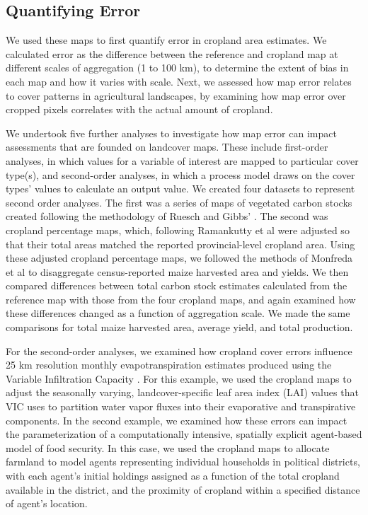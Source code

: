 \documentclass{pnastwo}
\begin{document}
\begin{article}
\vspace{-0.5 cm}
\section{Quantifying Error}
We used these maps to first quantify error in cropland area estimates. We calculated error as the difference between the reference and cropland map at different scales of aggregation (1 to 100 km), to determine the extent of bias in each map and how it varies with scale. Next, we assessed how map error relates to cover patterns in agricultural  landscapes, by examining how map error over cropped pixels correlates with the actual amount of cropland.    

We undertook five further analyses to investigate how map error can impact assessments that are founded on landcover maps. These include first-order analyses, in which values for a variable of interest are mapped to  particular cover type(s), and second-order analyses, in which a process model draws on the cover types' values to calculate an output value. We created four datasets to represent second order analyses. The first was a series of maps of vegetated carbon stocks created following the methodology of Ruesch and Gibbs' \cite{ruesch_new_2008}. The second was cropland percentage maps, which, following Ramankutty et al \cite{ramankutty_farming_2008} were adjusted so that their total areas matched the reported provincial-level cropland area. Using these adjusted cropland percentage maps, we followed the methods of Monfreda et al \cite{monfreda_farming_2008} to disaggregate census-reported maize harvested area and yields. We then compared differences between total carbon stock estimates calculated from the reference map with those from the four cropland maps, and again examined how these differences changed as a function of aggregation scale.  We made the same comparisons for total maize harvested area, average yield, and total production. 

For the second-order analyses, we examined how cropland cover errors influence 25 km resolution monthly evapotranspiration estimates produced using the Variable Infiltration Capacity \cite{liang_simple_1994}. For this example, we used the cropland maps to adjust the seasonally varying, landcover-specific leaf area index (LAI) values that VIC uses to partition water vapor fluxes into their evaporative and transpirative components. In the second example, we examined how these errors can impact the parameterization of a computationally intensive, spatially explicit agent-based model of food security. In this case, we used the cropland maps to allocate farmland to model agents representing individual households in political districts, with each agent's initial holdings assigned as a function of the total cropland available in the district, and the proximity of cropland within a specified distance of agent's location.  



\end{article}
\end{document}
